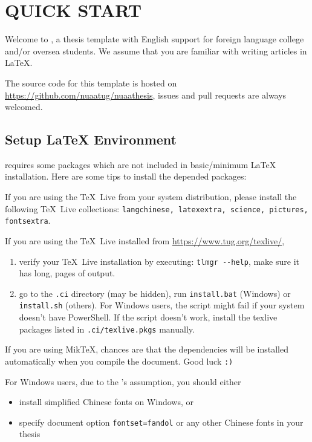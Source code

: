 \chapter{QUICK START}

Welcome to \nuaathesis,
a thesis template with English support for foreign language college and/or oversea students.
We assume that you are familiar with writing articles in \LaTeX.

The source code for this template is hosted on \url{https://github.com/nuaatug/nuaathesis},
issues and pull requests are always welcomed.

\section{Setup \LaTeX{} Environment}

\nuaathesis{} requires some packages which are not included in basic/minimum \LaTeX{} installation.
Here are some tips to install the depended packages:

If you are using the \TeX~Live from your system distribution,
please install the following \TeX~Live collections:
\verb|langchinese, latexextra, science, pictures, fontsextra|.

If you are using the \TeX~Live installed from \url{https://www.tug.org/texlive/},
\begin{enumerate}
  \item verify your \TeX~Live installation by executing: \verb|tlmgr --help|,
  make sure it has long, pages of output.
  \item go to the \verb|.ci| directory (may be hidden),
  run \verb|install.bat| (Windows) or \verb|install.sh| (others).
  For Windows users, the script might fail if your system doesn't have PowerShell.
  If the script doesn't work, install the texlive packages listed in \verb|.ci/texlive.pkgs| manually.
\end{enumerate}

If you are using Mik\TeX,
chances are that the dependencies will be installed automatically when you compile the document.
Good luck \verb|:)|

For Windows users, due to the \CTeX's assumption, you should either
\begin{itemize}
  \item install simplified Chinese fonts on Windows, or
  \item specify document option \verb|fontset=fandol| or any other Chinese fonts in your thesis
\end{itemize}

